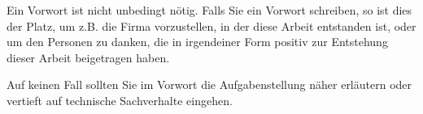\preface

Ein Vorwort ist nicht unbedingt nötig. Falls Sie ein Vorwort schreiben, so ist dies der Platz, um z.B. die Firma vorzustellen, in der diese Arbeit entstanden ist, oder um den Personen zu danken, die in irgendeiner Form positiv zur Entstehung dieser Arbeit beigetragen haben.

Auf keinen Fall sollten Sie im Vorwort die Aufgabenstellung näher erläutern oder vertieft auf technische Sachverhalte eingehen.
